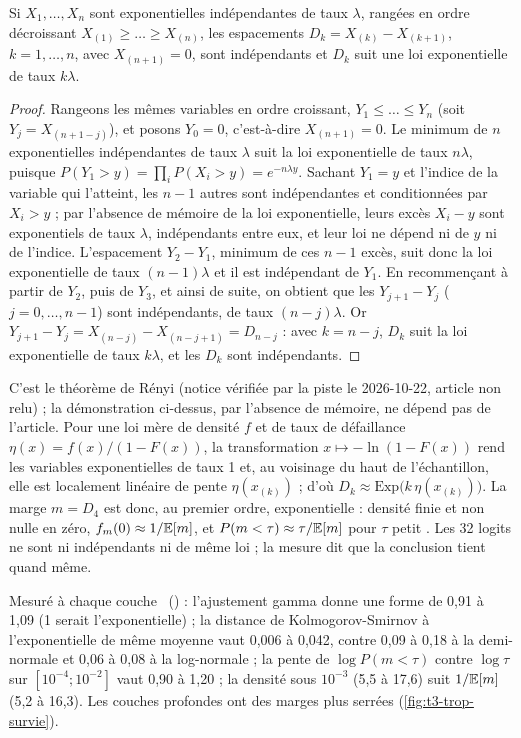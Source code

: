 \begin{lemme}\label{t3tro:lem:renyi}
Si $X_1, \dots, X_n$ sont exponentielles indépendantes de taux $\lambda$, rangées en ordre décroissant $X_{(1)} \ge \dots \ge X_{(n)}$, les espacements $D_k = X_{(k)} - X_{(k+1)}$, $k = 1, \dots, n$, avec $X_{(n+1)} = 0$, sont indépendants et $D_k$ suit une loi exponentielle de taux $k\lambda$.
\end{lemme}
\begin{proof}
Rangeons les mêmes variables en ordre croissant, $Y_1 \le \dots \le Y_n$ (soit $Y_j = X_{(n+1-j)}$), et posons $Y_0 = 0$, c'est-à-dire $X_{(n+1)} = 0$. Le minimum de $n$ exponentielles indépendantes de taux $\lambda$ suit la loi exponentielle de taux $n\lambda$, puisque $P(Y_1 > y) = \prod_i P(X_i > y) = e^{-n\lambda y}$. Sachant $Y_1 = y$ et l'indice de la variable qui l'atteint, les $n - 1$ autres sont indépendantes et conditionnées par $X_i > y$ ; par l'absence de mémoire de la loi exponentielle, leurs excès $X_i - y$ sont exponentiels de taux $\lambda$, indépendants entre eux, et leur loi ne dépend ni de $y$ ni de l'indice. L'espacement $Y_2 - Y_1$, minimum de ces $n - 1$ excès, suit donc la loi exponentielle de taux $(n-1)\lambda$ et il est indépendant de $Y_1$. En recommençant à partir de $Y_2$, puis de $Y_3$, et ainsi de suite, on obtient que les $Y_{j+1} - Y_j$ ($j = 0, \dots, n-1$) sont indépendants, de taux $(n - j)\lambda$. Or $Y_{j+1} - Y_j = X_{(n-j)} - X_{(n-j+1)} = D_{n-j}$ : avec $k = n - j$, $D_k$ suit la loi exponentielle de taux $k\lambda$, et les $D_k$ sont indépendants.
\end{proof}
C'est le théorème de Rényi \cite{renyi1953ordre} (notice vérifiée par la piste le 2026-10-22, article non relu) ; la démonstration ci-dessus, par l'absence de mémoire, ne dépend pas de l'article. Pour une loi mère de densité $f$ et de taux de défaillance $\eta(x) = f(x)/(1 - F(x))$, la transformation $x \mapsto -\ln(1 - F(x))$ rend les variables exponentielles de taux 1 et, au voisinage du haut de l'échantillon, elle est localement linéaire de pente $\eta(x_{(k)})$ ; d'où $D_k \approx \mathrm{Exp}\bigl(k\,\eta(x_{(k)})\bigr)$. La marge $m = D_4$ est donc, au premier ordre, exponentielle : densité finie et non nulle en zéro, $f_m(0) \approx 1/\mathbb{E}[m]$, et $P(m < \tau) \approx \tau/\mathbb{E}[m]$ pour $\tau$ petit \calc. Les 32 logits ne sont ni indépendants ni de même loi ; la mesure dit que la conclusion tient quand même.

Mesuré à chaque couche \mes~() : l'ajustement gamma donne une forme de 0,91 à 1,09 (1 serait l'exponentielle) ; la distance de Kolmogorov-Smirnov à l'exponentielle de même moyenne vaut 0,006 à 0,042, contre 0,09 à 0,18 à la demi-normale et 0,06 à 0,08 à la log-normale ; la pente de $\log P(m < \tau)$ contre $\log\tau$ sur $[10^{-4} ; 10^{-2}]$ vaut 0,90 à 1,20 ; la densité sous $10^{-3}$ (5,5 à 17,6) suit $1/\mathbb{E}[m]$ (5,2 à 16,3). Les couches profondes ont des marges plus serrées (\cref{fig:t3-trop-survie}).

